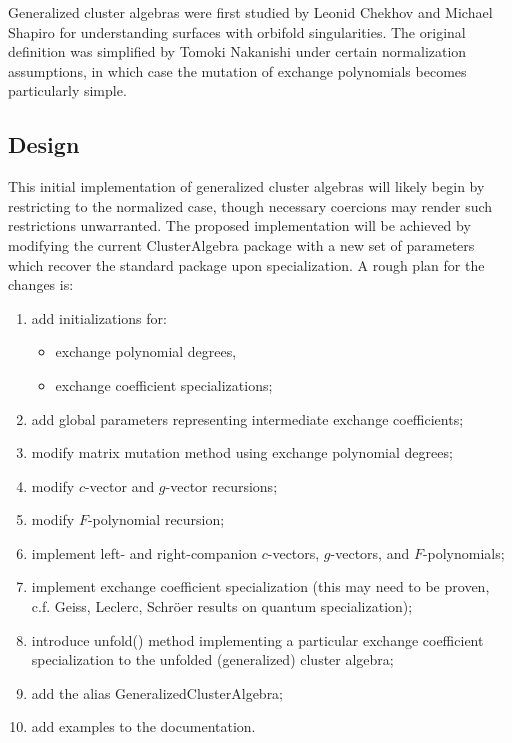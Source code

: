 \documentclass{amsart}
\begin{document}
  Generalized cluster algebras were first studied by Leonid Chekhov and Michael Shapiro for understanding surfaces with orbifold singularities.
  The original definition was simplified by Tomoki Nakanishi under certain normalization assumptions, in which case the mutation of exchange polynomials becomes particularly simple.

  \subsection*{Design}
  This initial implementation of generalized cluster algebras will likely begin by restricting to the normalized case, though necessary coercions may render such restrictions unwarranted. 
  The proposed implementation will be achieved by modifying the current ClusterAlgebra package with a new set of parameters which recover the standard package upon specialization.
  A rough plan for the changes is:
  \begin{enumerate}
    \item add initializations for:
      \begin{itemize}
        \item exchange polynomial degrees,
        \item exchange coefficient specializations;
      \end{itemize}
    \item add global parameters representing intermediate exchange coefficients;
    \item modify matrix mutation method using exchange polynomial degrees;
    \item modify $c$-vector and $g$-vector recursions;
    \item modify $F$-polynomial recursion;
    \item implement left- and right-companion $c$-vectors, $g$-vectors, and $F$-polynomials;
    \item implement exchange coefficient specialization (this may need to be proven, c.f. Geiss, Leclerc, Schr\"oer results on quantum specialization);
    \item introduce unfold() method implementing a particular exchange coefficient specialization to the unfolded (generalized) cluster algebra;
    \item add the alias GeneralizedClusterAlgebra;
    \item add examples to the documentation.
  \end{enumerate}
\end{document}

